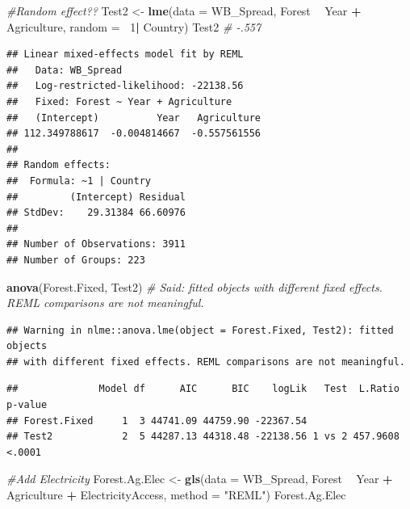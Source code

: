 \documentclass[12pt,]{article}
\newenvironment{Shaded}{\begin{snugshade}}{\end{snugshade}}
\newcommand{\KeywordTok}[1]{\textcolor[rgb]{0.13,0.29,0.53}{\textbf{#1}}}
\newcommand{\DataTypeTok}[1]{\textcolor[rgb]{0.13,0.29,0.53}{#1}}
\newcommand{\DecValTok}[1]{\textcolor[rgb]{0.00,0.00,0.81}{#1}}
\newcommand{\StringTok}[1]{\textcolor[rgb]{0.31,0.60,0.02}{#1}}
\newcommand{\CommentTok}[1]{\textcolor[rgb]{0.56,0.35,0.01}{\textit{#1}}}
\newcommand{\OperatorTok}[1]{\textcolor[rgb]{0.81,0.36,0.00}{\textbf{#1}}}
\newcommand{\NormalTok}[1]{#1}
\begin{document}
\begin{Shaded}
\begin{Highlighting}[]
\CommentTok{#Random effect??}
\NormalTok{Test2 <-}\StringTok{  }\KeywordTok{lme}\NormalTok{(}\DataTypeTok{data =}\NormalTok{ WB_Spread,}
\NormalTok{              Forest }\OperatorTok{~}\StringTok{ }\NormalTok{Year }\OperatorTok{+}\StringTok{ }\NormalTok{Agriculture, }
              \DataTypeTok{random =} \OperatorTok{~}\DecValTok{1}\OperatorTok{|}\StringTok{ }\NormalTok{Country)}
\NormalTok{Test2 }\CommentTok{# -.557}
\end{Highlighting}
\end{Shaded}

\begin{verbatim}
## Linear mixed-effects model fit by REML
##   Data: WB_Spread 
##   Log-restricted-likelihood: -22138.56
##   Fixed: Forest ~ Year + Agriculture 
##   (Intercept)          Year   Agriculture 
## 112.349788617  -0.004814667  -0.557561556 
## 
## Random effects:
##  Formula: ~1 | Country
##         (Intercept) Residual
## StdDev:    29.31384 66.60976
## 
## Number of Observations: 3911
## Number of Groups: 223
\end{verbatim}

\begin{Shaded}
\begin{Highlighting}[]
\KeywordTok{anova}\NormalTok{(Forest.Fixed, Test2) }\CommentTok{# Said: fitted objects with different fixed effects. REML comparisons are not meaningful.}
\end{Highlighting}
\end{Shaded}

\begin{verbatim}
## Warning in nlme::anova.lme(object = Forest.Fixed, Test2): fitted objects
## with different fixed effects. REML comparisons are not meaningful.
\end{verbatim}

\begin{verbatim}
##              Model df      AIC      BIC    logLik   Test  L.Ratio p-value
## Forest.Fixed     1  3 44741.09 44759.90 -22367.54                        
## Test2            2  5 44287.13 44318.48 -22138.56 1 vs 2 457.9608  <.0001
\end{verbatim}

\begin{Shaded}
\begin{Highlighting}[]
\CommentTok{#Add Electricity }
\NormalTok{Forest.Ag.Elec <-}\StringTok{ }\KeywordTok{gls}\NormalTok{(}\DataTypeTok{data =}\NormalTok{ WB_Spread, }
\NormalTok{                    Forest }\OperatorTok{~}\StringTok{ }\NormalTok{Year }\OperatorTok{+}\StringTok{ }\NormalTok{Agriculture }\OperatorTok{+}\StringTok{ }\NormalTok{ElectricityAccess,}
                    \DataTypeTok{method =} \StringTok{"REML"}\NormalTok{)}
\NormalTok{Forest.Ag.Elec}
\end{Highlighting}
\end{Shaded}
\end{document}
